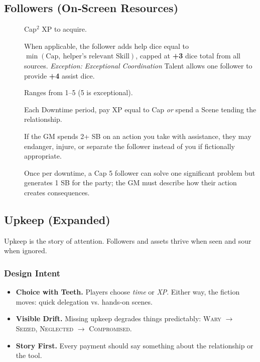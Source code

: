 \subsection{Followers (On‑Screen Resources)}\label{subsec:followers}

\begin{description}
    \item[] Cap\(^{2}\) XP to acquire.
    \item[] When applicable, the follower adds help dice equal to \(\min(\text{Cap},\ \text{helper's relevant Skill})\), capped at \textbf{+3} dice total from all sources. \emph{Exception:} \textit{Exceptional Coordination} Talent allows one follower to provide \textbf{+4} assist dice.
    \item[] Ranges from 1--5 (5 is exceptional).
    \item[] Each Downtime period, pay XP equal to Cap \emph{or} spend a Scene tending the relationship.
    \item[] If the GM spends 2+ SB on an action you take with assistance, they may endanger, injure, or separate the follower instead of you if fictionally appropriate.
    \item[] Once per downtime, a Cap 5 follower can solve one significant problem but generates 1 SB for the party; the GM must describe how their action creates consequences.
\end{description}

\subsection{Upkeep (Expanded)}\label{sec:upkeep_expanded}

Upkeep is the story of attention. Followers and assets thrive when seen and sour when ignored.

\subsubsection{Design Intent}\label{subsec:upkeep_intent}
\begin{itemize}
    \item \textbf{Choice with Teeth.} Players choose \emph{time} or \emph{XP}. Either way, the fiction moves: quick delegation vs. hands‑on scenes.
    \item \textbf{Visible Drift.} Missing upkeep degrades things predictably: \textsc{Wary} $\rightarrow$ \textsc{Seized}, \textsc{Neglected} $\rightarrow$ \textsc{Compromised}.
    \item \textbf{Story First.} Every payment should say something about the relationship or the tool.
\end{itemize}

